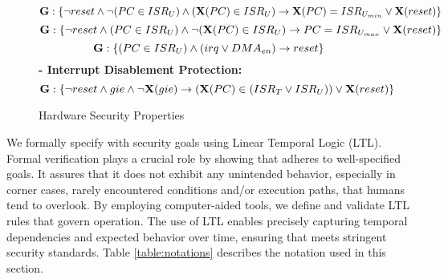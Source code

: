 \begin{figure*}[t]
\begin{mdframed}[userdefinedwidth=0.95\textwidth]
\begin{equation}
            \textbf{G}: \{\neg reset \land \neg (PC \in ISR_U) \land (\textbf{X}(PC) \in ISR_U) \rightarrow \textbf{X}(PC) = ISR_{U_{min}} \lor \textbf{X}(reset) \}
        \end{equation}
        \begin{equation}\label{eq:uart-isr-protection2}
            \textbf{G}: \{\neg reset \land (PC \in ISR_U) \land \neg (\textbf{X}(PC) \in ISR_U) \rightarrow PC = ISR_{U_{max}} \lor \textbf{X}(reset) \}            
        \end{equation}
        \begin{equation}\label{eq:uart-isr-protection3}
            \textbf{G}: \{(PC \in ISR_U) \land (irq \lor DMA_{en}) \rightarrow reset \}
        \end{equation}
        \textbf{- \small Interrupt Disablement Protection:}
        \begin{equation}\label{eq:irq-disablement-protection}
            \textbf{G}: \{\neg reset \land gie \land \neg \textbf{X}(gie) \rightarrow (\textbf{X}(PC) \in (ISR_T \lor ISR_U)) \lor \textbf{X}(reset)\}
        \end{equation}        
    \end{mdframed}
    \caption{\trapscasu Hardware Security Properties}\label{fig:hwprop}
\end{figure*}

We formally specify \trapscasu with \trapsnortc security goals using Linear Temporal Logic (LTL).
Formal verification plays a crucial role by showing that \trapscasu adheres to well-specified goals.
It assures that it does not exhibit any unintended behavior, especially in corner cases, 
rarely encountered conditions and/or execution paths, that humans tend to overlook.
By employing computer-aided tools, we define and validate LTL rules that govern \trapscasu operation.
The use of LTL enables precisely capturing temporal dependencies and expected behavior 
over time, ensuring that \trapscasu meets stringent security standards.
Table \ref{table:notations} describes the notation used in this section.

